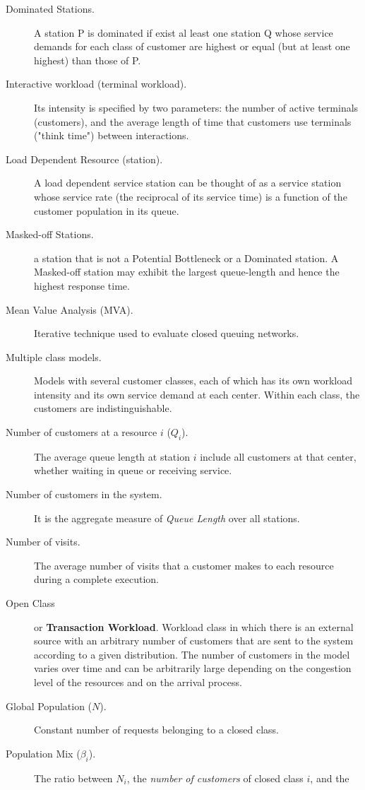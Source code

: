 \begin{description}
\item[Dominated Stations.] A station P is dominated if exist al
least one station Q whose service demands for each class of
customer are highest or equal (but at least one highest) than
those of P. \item[Interactive workload (terminal workload).] Its
intensity is specified by two parameters: the number of active
terminals (customers), and the average length of time that
customers use terminals ("think time") between interactions.
\item[Load Dependent Resource (station).] A load dependent service
station can be thought of as a service station whose service rate
(the reciprocal of its service time) is a function of the customer
population in its queue. \item[Masked-off Stations.] a station
that is not a Potential Bottleneck or a Dominated station. A
Masked-off station may exhibit the largest queue-length and hence
the highest response time. \item[Mean Value Analysis (MVA).]
Iterative technique used to evaluate closed queuing networks.
\item[Multiple class models.] Models with several customer
classes, each of which has its own workload intensity and its own
service demand at each center. Within each class, the customers
are indistinguishable. \item[Number of customers at a resource $i$
($Q_i$).] The average queue length at station $i$ include all
customers at that center, whether waiting in queue or receiving
service. \item[Number of customers in the system.] It is the
aggregate measure of \emph{Queue Length} over all stations.
\item[Number of visits.] The average number of visits that a
customer makes to each resource during a complete execution.
\item[Open Class]  or {\bf Transaction Workload}. Workload class
in which there is an external source with an arbitrary number of
customers that are sent to the system according to a given
distribution. The number of customers in the model varies over
time and can be arbitrarily large depending on the congestion
level of the resources and on the arrival process. \item[Global
Population ($N$).] Constant number of requests belonging to a
closed class. \item[Population Mix ($\beta_i$).] The ratio between
$N_i$, the \emph{number of customers} of closed class $i$, and the

\end{description}

